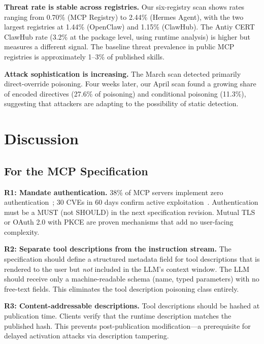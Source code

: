 \documentclass[letterpaper,twocolumn,10pt]{article}
\begin{document}
\textbf{Threat rate is stable across registries.}  Our six-registry scan
shows rates ranging from 0.70\% (MCP Registry) to 2.44\% (Hermes Agent),
with the two largest registries at 1.44\% (OpenClaw) and 1.15\%
(ClawHub).  The Antiy CERT ClawHub rate (3.2\% at the package level,
using runtime analysis) is higher but measures a different signal.  The
baseline threat prevalence in public MCP registries is approximately
1--3\% of published skills.

\textbf{Attack sophistication is increasing.}  The March scan detected
primarily direct-override poisoning.  Four weeks later, our April scan
found a growing share of encoded directives (27.6\% of poisoning) and
conditional poisoning (11.3\%), suggesting that attackers are adapting to
the possibility of static detection.

\section{Discussion}
\label{sec:discussion}

\subsection{For the MCP Specification}

\textbf{R1: Mandate authentication.}  38\% of MCP servers implement zero
authentication~\cite{invariant2025}; 30 CVEs in 60 days confirm active
exploitation~\cite{cve6514,cve53773,cve68143,cve68144,cve68145,cve49596,
cve59536}.  Authentication must be a MUST (not SHOULD) in the next
specification revision.  Mutual TLS or OAuth 2.0 with PKCE are proven
mechanisms that add no user-facing complexity.

\textbf{R2: Separate tool descriptions from the instruction stream.}
The specification should define a structured metadata field for tool
descriptions that is rendered to the user but \emph{not} included in the
LLM's context window.  The LLM should receive only a machine-readable
schema (name, typed parameters) with no free-text fields.  This
eliminates the tool description poisoning class entirely.

\textbf{R3: Content-addressable descriptions.}  Tool descriptions should
be hashed at publication time.  Clients verify that the runtime
description matches the published hash.  This prevents post-publication
modification---a prerequisite for delayed activation attacks via
description tampering.
\end{document}
